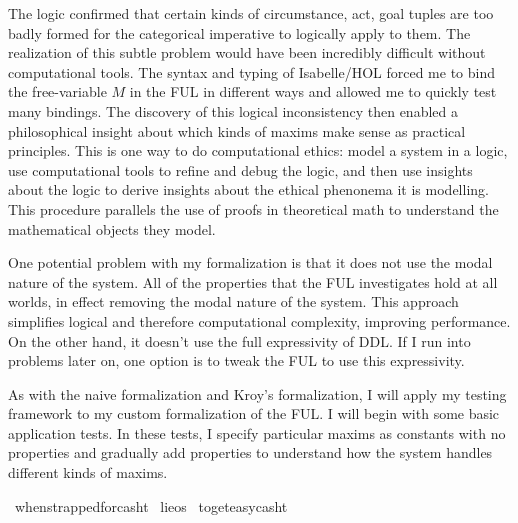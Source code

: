 \begin{isabellebody}
\begin{isamarkuptext}
The logic confirmed that certain kinds
of circumstance, act, goal tuples are too badly formed for the categorical imperative to logically 
apply to them. The realization of this subtle problem would have been incredibly difficult without 
computational tools. The syntax and typing of Isabelle/HOL forced me to bind the free-variable $M$
in the FUL in different ways and allowed me to quickly test many bindings. The discovery of this 
logical inconsistency then enabled a philosophical insight about which kinds of maxims make sense as 
practical principles. This is one way to do computational ethics: model a system in a logic, use 
computational tools to refine and debug the logic, and then use insights about the logic to derive 
insights about the ethical phenonema it is modelling. This procedure parallels the use of proofs in 
theoretical math to understand the mathematical objects they model.%
\end{isamarkuptext}\isamarkuptrue%
%
\begin{isamarkuptext}%
One potential problem with my formalization is that it does not use the modal nature of the system. 
All of the properties that the FUL investigates hold at all worlds, in effect removing the modal nature 
of the system. This approach simplifies logical and therefore computational complexity, improving 
performance. On the other hand, it doesn't use the full expressivity of DDL. If I run into problems 
later on, one option is to tweak the FUL to use this expressivity.%
\end{isamarkuptext}\isamarkuptrue%
%
\isadelimdocument
%
\endisadelimdocument
%
\isatagdocument
%
\isamarkuptrue%
%
\endisatagdocument
{\isafolddocument}%
%
\isadelimdocument
%
\endisadelimdocument
%
\begin{isamarkuptext}%
As with the naive formalization and Kroy's formalization, I will apply my testing framework to 
my custom formalization of the FUL. I will begin with some basic application tests. In these tests, 
I specify particular maxims as constants with no properties and gradually add properties to understand 
how the system handles different kinds of maxims.%
\end{isamarkuptext}\isamarkuptrue%
\isamarkupfalse%
\ when{\isacharunderscore}strapped{\isacharunderscore}for{\isacharunderscore}cash{\isacharcolon}{\isacharcolon}t\isanewline
{}\isamarkupfalse%
\ lie{\isacharcolon}{\isacharcolon}os\isanewline
{}\isamarkupfalse%
\ to{\isacharunderscore}get{\isacharunderscore}easy{\isacharunderscore}cash{\isacharcolon}{\isacharcolon}t\isanewline

\end{isabellebody}
